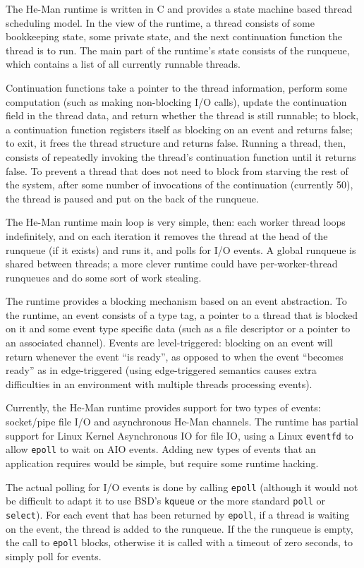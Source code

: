 \documentclass[preprint]{sigplanconf}
\renewcommand{\t}{\texttt}
\begin{document}
The He-Man runtime is written in C and provides a state machine based
thread scheduling model. In the view of the runtime, a thread consists
of some bookkeeping state, some private state, and the next
continuation function the thread is to run. The main part of the
runtime's state consists of the runqueue, which contains a list of all
currently runnable threads.

Continuation functions take a pointer to the thread information,
perform some computation (such as making non-blocking I/O calls),
update the continuation field in the thread data, and return whether
the thread is still runnable; to block, a continuation function
registers itself as blocking on an event and returns false; to exit,
it frees the thread structure and returns false.  Running a thread,
then, consists of repeatedly invoking the thread's continuation
function until it returns false. To prevent a thread that does not
need to block from starving the rest of the system, after some number
of invocations of the continuation (currently 50), the thread is
paused and put on the back of the runqueue.

The He-Man runtime main loop is very simple, then: each worker thread
loops indefinitely, and on each iteration it removes the thread at the
head of the runqueue (if it exists) and runs it, and polls for I/O
events. A global runqueue is shared between threads; a more clever
runtime could have per-worker-thread runqueues and do some sort of
work stealing.

The runtime provides a blocking mechanism based on an event
abstraction. To the runtime, an event consists of a type tag, a
pointer to a thread that is blocked on it and some event type specific
data (such as a file descriptor or a pointer to an associated
channel). Events are level-triggered: blocking on an event will return
whenever the event ``is ready'', as opposed to when the event
``becomes ready'' as in edge-triggered (using edge-triggered semantics
causes extra difficulties in an environment with multiple threads
processing events).

Currently, the He-Man runtime provides support for two types of
events: socket/pipe file I/O and asynchronous He-Man channels.  The
runtime has partial support for Linux Kernel Asynchronous IO for file
IO, using a Linux \t{eventfd} to allow \t{epoll} to wait on AIO
events. Adding new types of events that an application requires would
be simple, but require some runtime hacking.

The actual polling for I/O events is done by calling \t{epoll}
(although it would not be difficult to adapt it to use BSD's
\t{kqueue} or the more standard \t{poll} or \t{select}).  For each
event that has been returned by \t{epoll}, if a thread is waiting on
the event, the thread is added to the runqueue. If the the runqueue is
empty, the call to \t{epoll} blocks, otherwise it is called with a
timeout of zero seconds, to simply poll for events.
\end{document}
